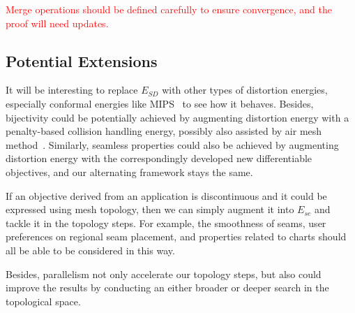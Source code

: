 \textcolor{red}{Merge operations should be defined carefully to ensure convergence, and the proof will need updates.}

\subsection{Potential Extensions}
It will be interesting to replace $E_{SD}$ with other types of distortion energies, especially conformal energies like MIPS~\cite{Hormann2000MIPS} to see how it behaves.
Besides, bijectivity could be potentially achieved by augmenting distortion energy with a penalty-based collision handling energy, possibly also assisted by air mesh method~\cite{?}.
Similarly, seamless properties could also be achieved by augmenting distortion energy with the correspondingly developed new differentiable objectives, and our alternating framework stays the same.

If an objective derived from an application is discontinuous and it could be expressed using mesh topology, then we can simply augment it into $E_{se}$ and tackle it in the topology steps. For example, the smoothness of seams, user preferences on regional seam placement, and properties related to charts should all be able to be considered in this way.

Besides, parallelism not only accelerate our topology steps, but also could improve the results by conducting an either broader or deeper search in the topological space.